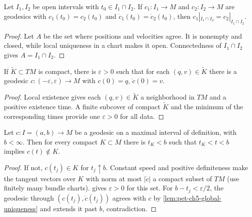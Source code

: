 \begin{lemma}
  \label{lem:pet-ch5-global-uniqueness}
  \leanok
  Let $I_1,I_2$ be open intervals with $t_0\in I_1\cap I_2$. If $c_1:I_1\to M$ and
  $c_2:I_2\to M$ are geodesics with $c_1(t_0)=c_2(t_0)$ and $\dot c_1(t_0)=\dot c_2(t_0)$,
  then $c_1|_{I_1\cap I_2}=c_2|_{I_1\cap I_2}$.
\end{lemma}
\begin{proof}
  \sketch
  Let $A$ be the set where positions and velocities agree.  It is nonempty and
  closed, while local uniqueness in a chart makes it open.  Connectedness of
  $I_1\cap I_2$ gives $A=I_1\cap I_2$.
\end{proof}

\begin{lemma}
  \label{lem:pet-ch5-uniform-time-existence}
  \leanok
  If $\tilde K\subset TM$ is compact, there is $\varepsilon>0$ such that for each
  $(q,v)\in\tilde K$ there is a geodesic $c:(-\varepsilon,\varepsilon)\to M$ with
  $c(0)=q$, $\dot c(0)=v$.
\end{lemma}
\begin{proof}
  \sketch
  Local existence gives each $(q,v)\in\tilde K$ a neighborhood in $TM$ and a
  positive existence time.  A finite subcover of compact $\tilde K$ and the
  minimum of the corresponding times provide one $\varepsilon>0$ for all data.
\end{proof}

\begin{proposition}
  \label{prop:pet-ch5-leaves-compact-set}
  \leanok
  Let $c:I=(a,b)\to M$ be a geodesic on a maximal interval of definition, with
  $b<\infty$. Then for every compact $K\subset M$ there is $t_K<b$ such that
  $t_K<t<b$ implies $c(t)\notin K$.
\end{proposition}
\begin{proof}
  \sketch
  If not, $c(t_j)\in K$ for $t_j\uparrow b$.  Constant speed and positive
  definiteness make the tangent vectors over $K$ with norm at most $|\dot c|$ a
  compact subset of $TM$ (use finitely many bundle charts).
   gives $\varepsilon>0$ for this set.
  For $b-t_j<\varepsilon/2$, the
  geodesic through $(c(t_j),\dot c(t_j))$ agrees with $c$ by
  \cref{lem:pet-ch5-global-uniqueness} and extends it past $b$, contradiction.
\end{proof}

